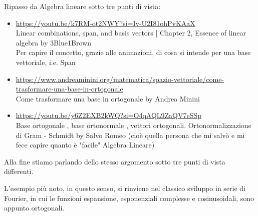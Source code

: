 \begin{tcolorbox}
    Ripasso da Algebra lineare sotto tre punti di vista: 

    \begin{itemize}
        \item \url{https://youtu.be/k7RM-ot2NWY?si=Iv-U2I81ohPvKAaX} \\ Linear combinations, span, and basis vectors | Chapter 2, Essence of linear algebra by 3Blue1Brown \\ Per capire il concetto, grazie alle animazioni, di cosa si intende per una base vettoriale, i.e. Span 
        \item \url{https://www.andreaminini.org/matematica/spazio-vettoriale/come-trasformare-una-base-in-ortogonale} \\ Come trasformare una base in ortogonale by Andrea Minini  
        \item \url{https://youtu.be/y6Z2EXB2kWQ?si=O4qAQL9ZaQV7eSSp} \\ Base ortogonale , base ortonormale , vettori ortogonali. Ortonormalizzazione di Gram - Schmidt by Salvo Romeo (cioè quella persona che mi salvò e mi fece capire quanto è "facile" Algebra Lineare)
    \end{itemize} 

    Alla fine stiamo parlando dello stesso argomento sotto tre punti di vista differenti.
\end{tcolorbox}

L'esempio più noto, in questo senso, si rinviene nel classico sviluppo in serie di Fourier, 
in cui le funzioni espansione, esponenziali complesse e cosinusoidali, sono appunto ortogonali. \newline 

